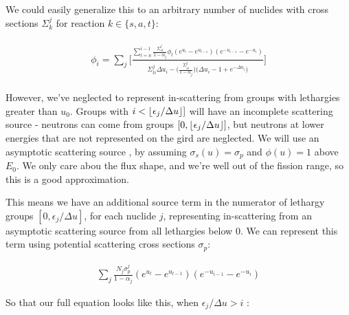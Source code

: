 \documentclass{article}
\DeclarePairedDelimiter\floor{\lfloor}{\rfloor}
\begin{document}
        We could easily generalize this to an arbitrary number of nuclides with cross sections $\Sigma_k^j$ for 
        reaction $k \in \{s,a,t\}$:
        
        \begin{align}
        \begin{split}
            \label{eq:soln}
            \phi_i =
                \sum_j \bigg[
            \frac{
                \sum_{l = n}^{i-1} \frac{ \Sigma_{sl}^j }{1-\alpha_j}  \phi_l  
                (e^{u_l} - e^{u_{l-1}})   (e^{-u_{i-1}} - e^{-u_{i}}) 
            }
            {  
               \Sigma_{ti}^j  \Delta u_i  - 
                \big( \frac{ \Sigma_{si}^j }{1-\alpha_j}  \big)
            \big( \Delta u_i -1 + e^{-\Delta u_i} \big) 
             }
         \bigg]
        \end{split}
        \end{align}
        
        
        However, we've neglected to represent in-scattering from groups with lethargies greater than 
        $u_0$. Groups with $i < \floor{\epsilon_j/\Delta u}]$ will have an incomplete scattering source - 
        neutrons can come from groups $[0 , \floor{\epsilon_j/\Delta u}]$, but neutrons at lower
        energies that are not represented on the gird are neglected. 
        We will use an asymptotic scattering source , by assuming $\sigma_s(u) = \sigma_p$ and 
        $\phi(u) = 1$ above $E_0$. 
        We only care abou the flux shape, and we're well out of the fission range, so this is a good approximation.
        
        This means we have an additional source term in the numerator of 
        lethargy groups $[0,\epsilon_j/\Delta u]$, for each nuclide $j$,
        representing in-scattering from an asymptotic scattering source from
        all lethargies below 0.
        We can represent this term using potential scattering cross sections $\sigma_p$:
        
        \begin{align}
            \sum_j \frac{ N_j \sigma_{p}^j }{1-\alpha_j}
                (e^{u_l} - e^{u_{l-1}})   (e^{-u_{i-1}} - e^{-u_{i}}) 
        \end{align}

        So that our full equation looks like this, when $\epsilon_j/\Delta u > i$ :
        
\end{document}
